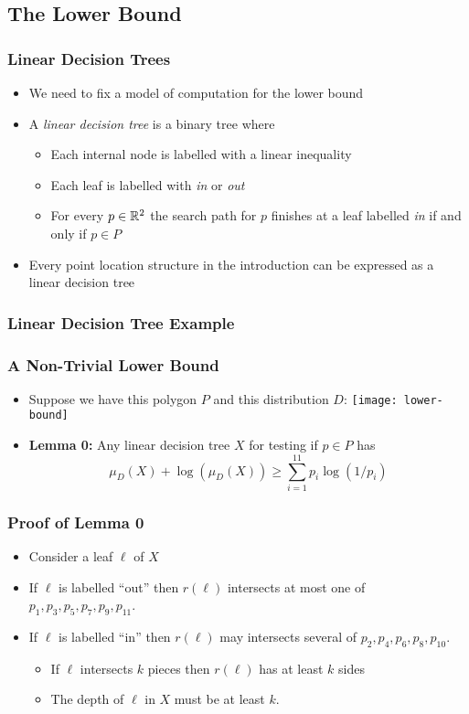 \documentclass{beamer}
\begin{document}
\subsection{The Lower Bound}
\frame
{
   \frametitle{Linear Decision Trees}
   \begin{itemize}
     \item<1-> We need to fix a model of computation for the lower bound
     \item<2-> A \emph{linear decision tree} is a binary tree where
       \begin{itemize}
          \item Each internal node is labelled with a linear inequality
          \item Each leaf is labelled with \emph{in} or \emph{out}
          \item For every $p\in\mathbb{R}^2$ the search path for $p$ finishes at 
           a leaf labelled \emph{in} if and only if $p\in P$
       \end{itemize}
     \item<3-> Every point location structure in the
	introduction can be expressed as a linear decision tree
   \end{itemize}
}

\frame
{
	\frametitle{Linear Decision Tree Example}
}


\frame
{
	\frametitle{A Non-Trivial Lower Bound}
        \begin{itemize}
          \item<1-> Suppose we have this polygon $P$ and this distribution $D$:
            \texttt{[image: lower-bound]}
          \item<2-> \textbf{Lemma 0:} Any linear decision tree $X$ for
testing if $p\in P$ has 
\[  \mu_D(X) + \log(\mu_D(X)) \ge \sum_{i=1}^{11} p_i\log(1/p_i)
 \]
        \end{itemize} 
}

\frame
{
	\frametitle{Proof of Lemma 0}
        \begin{itemize}
	   \item<1-> Consider a leaf $\ell$ of $X$
	   \item<2-> If $\ell$ is labelled ``out'' then $r(\ell)$
intersects at most one of $p_1,p_3,p_5,p_7,p_9,p_{11}$.
           \item<3-> If $\ell$ is labelled ``in'' then $r(\ell)$ may
intersects several of $p_2,p_4,p_6,p_8,p_{10}$.
	   \begin{itemize}
		\item <4->If $\ell$ intersects $k$ pieces then
$r(\ell)$ has at least $k$ sides
		\item <5->The depth of $\ell$ in $X$ must be at least
$k$.
	   \end{itemize}
        \end{itemize}
}
\end{document}
